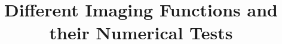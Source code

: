 \documentclass[12pt]{iopart}
\begin{document}

\def\debproof{\noindent {\bf Proof.} }
\def\finproof{\hfill {\small $\Box$} \\}
\makeatletter %
\makeatother  %
\renewcommand\theequation{{\thesection}.{\arabic{equation}}}

\title[]{Different Imaging Functions and their Numerical Tests}
\author{ }
\address{}



\maketitle

\newcommand{\eps}{\varepsilon}
\newcommand{\RR}{\mathcal{R}}
\newtheorem{lem}{Lemma}[section]
\newtheorem{prop}{Proposition}[section]
\newtheorem{cor}{Corollary}[section]
\newtheorem{thm}{Theorem}[section]
\newtheorem{rem}{Remark}[section]
\newtheorem{alg}{Algorithm}[section]
\newtheorem{assum}{Assumption}[section]
\newtheorem{definition}{Definition}[section]


\newcommand{\MyRoman}[1]{\rm\setcounter{RomanNumber}{#1}\Roman{RomanNumber}}

\newcommand{\bL}{\mathbf{L}}
\newcommand{\bH}{\mathbf{H}}
\newcommand{\bW}{\mathbf{W}}
\newcommand{\bP}{\mathbf{P}}
\newcommand{\bQ}{\mathbf{Q}}
\newcommand{\bp}{\mathbf{p}}
\newcommand{\bq}{\mathbf{q}}
\newcommand{\uL}{u_{_{\rm L}}}
\newcommand{\vL}{v_{_{\rm L}}}
\newcommand{\tuL}{\tilde u_{_{\rm L}}}
\newcommand{\tvL}{\tilde v_{_{\rm L}}}
\newcommand{\fL}{f_{_{\rm L}}}
\newcommand{\gL}{g_{_{\rm L}}}
\newcommand{\bpL}{\bp_{_{\rm L}}}
\newcommand{\bqL}{\bq_{_{\rm L}}}
\newcommand{\tbpL}{\tilde{\bp}_{_{\rm L}}}
\newcommand{\tbqL}{\tilde{\bq}_{_{\rm L}}}
\newcommand{\tbpLf}{\tilde{\bp}_{_{\rm L,1}}}
\newcommand{\tbpLs}{\tilde{\bp}_{_{\rm L,2}}}
\newcommand{\tbqLf}{\tilde{\bq}_{_{\rm L,1}}}
\newcommand{\tbqLs}{\tilde{\bq}_{_{\rm L,2}}}
\newcommand{\bn}{\nu}
\newcommand{\bv}{\mathbf{v}}
\newcommand{\om}{\omega}
\newcommand{\pa}{\partial}
\newcommand{\la}{\langle}
\newcommand{\ra}{\rangle}
\newcommand{\lla}{\la{\hskip -2pt}\la}
\newcommand{\rra}{\ra{\hskip -2pt}\ra}
\newcommand{\jj}{\|{\hskip -0.8pt} |}
\newcommand{\al}{\alpha}
\newcommand{\ze}{\zeta}
\newcommand{\si}{\sigma}
\newcommand{\ep}{\varepsilon}
\newcommand{\na}{\nabla}
\newcommand{\vp}{\varphi}
\newcommand{\ga}{\gamma}
\newcommand{\Ga}{\Gamma}
\newcommand{\Om}{\Omega}
\newcommand{\de}{\delta}
\newcommand{\Th}{\Theta}
\newcommand{\De}{\Delta}
\newcommand{\Lam}{\Lambda}
\newcommand{\lam}{\lambda}
\newcommand{\tri}{\triangle}
\newcommand{\lj}{[{\hskip -2pt} [}
\newcommand{\rj}{]{\hskip -2pt} ]}
\newcommand{\bks}{\backslash}
\newcommand{\diam}{\mathrm{diam}}
\newcommand{\osc}{\mathrm{osc}}
\newcommand{\meas}{\mathrm{meas}}
\newcommand{\dist}{\mathrm{dist}}
\end{document}
